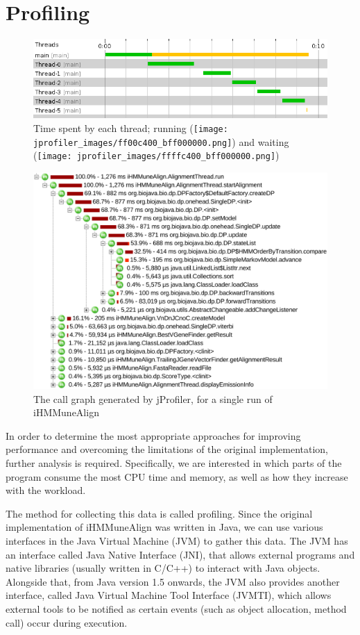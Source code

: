 \documentclass[a4paper,12pt]{report}
\begin{document}
\section{Profiling}
\begin{figure}[p]
  \centering
  \includegraphics[width=\textwidth]{threads-graph.png}
  \caption{Time spent by each thread;
  running (\protect\texttt{[image: jprofiler\_images/ff00c400\_bff000000.png]}) and
  waiting (\protect\texttt{[image: jprofiler\_images/ffffc400\_bff000000.png]})}
  \label{fig:threadgraph}
\end{figure}
\begin{figure}[p]
  \includegraphics[width=\textwidth]{call-tree.pdf}
 \caption{The call graph generated by jProfiler, for a single run of iHMMuneAlign}
 \label{fig:callgraph}
\end{figure}
In order to determine the most appropriate approaches for improving performance and overcoming the limitations of the original implementation, further analysis is required. Specifically, we are interested in which parts of the program consume the most CPU time and memory, as well as how they increase with the workload.

The method for collecting this data is called profiling. Since the original implementation of iHMMuneAlign was written in Java, we can use various interfaces in the Java Virtual Machine (JVM) to gather this data. The JVM has an interface called Java Native Interface (JNI)\autocite{jni}, that allows external programs and native libraries (usually written in C/C++) to interact with Java objects. Alongside that, from Java version 1.5 onwards, the JVM also provides another interface, called Java Virtual Machine Tool Interface (JVMTI)\autocite{jvmti}, which allows external tools to be notified as certain events (such as object allocation, method call) occur during execution.
\end{document}
